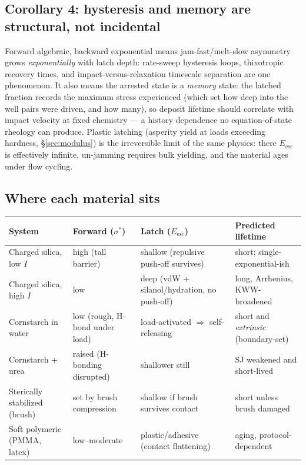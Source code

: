 \documentclass[11pt]{article}
\newcommand{\sigmastar}{\sigma^{*}}
\begin{document}
\subsection{Corollary 4: hysteresis and memory are structural, not incidental}
Forward algebraic, backward exponential means jam-fast/melt-slow asymmetry grows \emph{exponentially} with latch depth: rate-sweep hysteresis loops, thixotropic recovery times, and impact-versus-relaxation timescale separation are one phenomenon. It also means the arrested state is a \emph{memory} state: the latched fraction records the maximum stress experienced (which set how deep into the well pairs were driven, and how many), so deposit lifetime should correlate with impact velocity at fixed chemistry --- a history dependence no equation-of-state rheology can produce. Plastic latching (asperity yield at loads exceeding hardness, \S\ref{sec:modulus}) is the irreversible limit of the same physics: there $E_{\mathrm{esc}}$ is effectively infinite, un-jamming requires bulk yielding, and the material ages under flow cycling.

\subsection{Where each material sits}
\label{sec:placement}
\begin{center}
\small
\begin{tabular}{p{} p{} p{} p{}}
\hline
\textbf{System} & \textbf{Forward ($\sigmastar$)} & \textbf{Latch ($E_{\mathrm{esc}}$)} & \textbf{Predicted lifetime} \\
\hline
Charged silica, low $I$ & high (tall barrier) & shallow (repulsive push-off survives) & short; single-exponential-ish \\
Charged silica, high $I$ & low & deep (vdW + silanol/hydration, no push-off) & long, Arrhenius, KWW-broadened \\
Cornstarch in water & low (rough, H-bond under load) & load-activated $\Rightarrow$ self-releasing & short and \emph{extrinsic} (boundary-set) \\
Cornstarch + urea & raised (H-bonding disrupted) & shallower still & SJ weakened and short-lived \cite{james2018} \\
Sterically stabilized (brush) & set by brush compression & shallow if brush survives contact & short unless brush damaged \\
Soft polymeric (PMMA, latex) & low--moderate & plastic/adhesive (contact flattening) & aging, protocol-dependent \\
\hline
\end{tabular}
\end{center}
\end{document}
